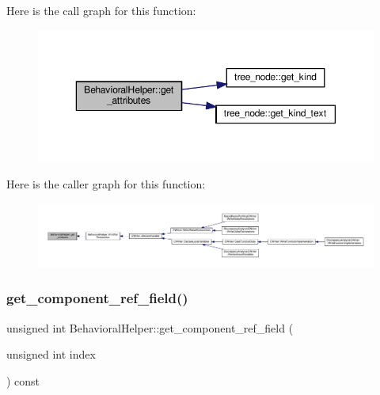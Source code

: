 Here is the call graph for this function\+:
\nopagebreak
\begin{figure}[H]
\begin{center}
\leavevmode
\includegraphics[width=350pt]{dd/db2/classBehavioralHelper_afb4630e8cd200f2989772d688b388632_cgraph}
\end{center}
\end{figure}
Here is the caller graph for this function\+:
\nopagebreak
\begin{figure}[H]
\begin{center}
\leavevmode
\includegraphics[width=350pt]{dd/db2/classBehavioralHelper_afb4630e8cd200f2989772d688b388632_icgraph}
\end{center}
\end{figure}
\mbox{\label{classBehavioralHelper_a434d3ef93a1ec7bb1e3d104aa6a936d4}} 
\subsubsection{\texorpdfstring{get\+\_\+component\+\_\+ref\+\_\+field()}{get\_component\_ref\_field()}}
{\footnotesize\ttfamily unsigned int Behavioral\+Helper\+::get\+\_\+component\+\_\+ref\+\_\+field (\begin{DoxyParamCaption}\item[{unsigned int}]{index }\end{DoxyParamCaption}) const\hspace{0.3cm}{\ttfamily [virtual]}}



